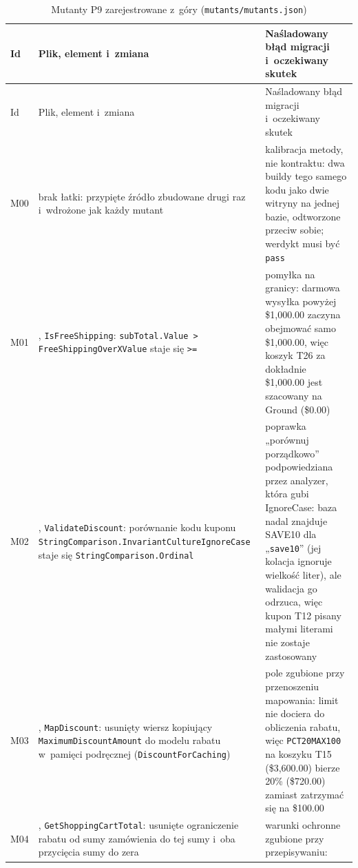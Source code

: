 {\footnotesize
\begin{xltabular}{\linewidth}{@{}l >{\raggedright\arraybackslash}X >{\raggedright\arraybackslash}X@{}}
\caption{Mutanty P9 zarejestrowane z~góry (\texttt{mutants/mutants.json})}\label{tab:bench-mutanty}\\
\toprule
Id & Plik, element i~zmiana & Naśladowany błąd migracji i~oczekiwany skutek \\
\midrule
\endfirsthead
\toprule
Id & Plik, element i~zmiana & Naśladowany błąd migracji i~oczekiwany skutek \\
\midrule
\endhead
\bottomrule
\endlastfoot
M00 & brak łatki: przypięte źródło zbudowane drugi raz i~wdrożone jak każdy mutant &
  kalibracja metody, nie kontraktu: dwa buildy tego samego kodu jako dwie witryny na jednej
  bazie, odtworzone przeciw sobie; werdykt musi być \texttt{pass} \\
M01 & ,
  \texttt{IsFreeShipping}: \texttt{subTotal.Value > FreeShippingOverXValue} staje się
  \texttt{>=} & pomyłka na granicy: darmowa wysyłka powyżej \$1,000.00 zaczyna obejmować
  samo \$1,000.00, więc koszyk T26 za dokładnie \$1,000.00 jest szacowany na Ground
  (\$0.00) \\
M02 & ,
  \texttt{ValidateDiscount}: porównanie kodu kuponu
  \texttt{StringComparison.\allowbreak{}InvariantCultureIgnoreCase} staje się
  \texttt{StringComparison.\allowbreak{}Ordinal} & poprawka „porównuj porządkowo”
  podpowiedziana przez analyzer, która gubi IgnoreCase: baza nadal znajduje SAVE10 dla
  „\texttt{\textvisiblespace{}save10\textvisiblespace{}}” (jej kolacja ignoruje wielkość
  liter), ale walidacja go odrzuca, więc kupon T12 pisany małymi literami nie zostaje
  zastosowany \\
M03 & ,
  \texttt{MapDiscount}: usunięty wiersz kopiujący \texttt{MaximumDiscountAmount} do modelu
  rabatu w~pamięci podręcznej (\texttt{DiscountForCaching}) & pole zgubione przy
  przenoszeniu mapowania: limit nie dociera do obliczenia rabatu, więc \texttt{PCT20MAX100}
  na koszyku T15 (\$3,600.00) bierze 20\% (\$720.00) zamiast zatrzymać się na \$100.00 \\
M04 & ,
  \texttt{GetShoppingCartTotal}: usunięte ograniczenie rabatu od sumy zamówienia do tej
  sumy i~oba przycięcia sumy do zera & warunki ochronne zgubione przy przepisywaniu:

\end{xltabular}}

